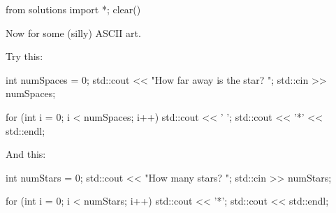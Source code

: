 \begin{python0}
from solutions import *; clear()
\end{python0}

Now for some (silly) ASCII art.

Try this:
\begin{console}
int numSpaces = 0;
std::cout << "How far away is the star? ";
std::cin >> numSpaces;

for (int i = 0; i < numSpaces; i++)
{   
    std::cout << ' ';
}
std::cout << '*' << std::endl;
\end{console}

And this:
\begin{console}
int numStars = 0;
std::cout << "How many stars? ";
std::cin >> numStars;

for (int i = 0; i < numStars; i++)
{   
    std::cout << '*';
}
std::cout << std::endl;
\end{console}

